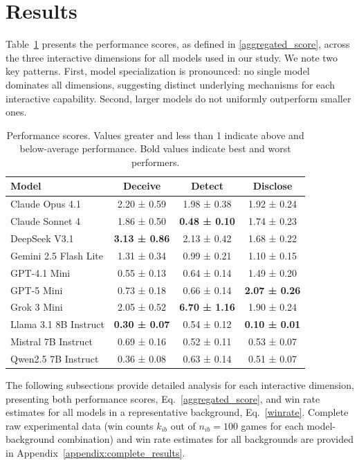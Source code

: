 \documentclass{article}
\begin{document}
\section{Results}
\label{sec:resuls}

Table~\ref{tab:aggregated_scores} presents the performance scores, as defined in \eqref{aggregated_score}, across the three interactive dimensions for all models used in our study. We note two key patterns. First, model specialization is pronounced: no single model dominates all dimensions, suggesting distinct underlying mechanisms for each interactive capability. Second, larger models do not uniformly outperform smaller ones.

\begin{table}[htbp]
\centering
\caption{Performance scores. Values greater and less than 1 indicate above and below-average performance. Bold values indicate best and worst performers.}
\begin{tabular}{lccc}
\toprule
\textbf{Model} & \textbf{Deceive} & \textbf{Detect} & \textbf{Disclose} \\
\midrule
Claude Opus 4.1 & 2.20 ± 0.59 & 1.98 ± 0.38 & 1.92 ± 0.24 \\
Claude Sonnet 4 & 1.86 ± 0.50 & \textbf{0.48 ± 0.10} & 1.74 ± 0.23 \\
DeepSeek V3.1 & \textbf{3.13 ± 0.86} & 2.13 ± 0.42 & 1.68 ± 0.22 \\
Gemini 2.5 Flash Lite & 1.31 ± 0.34 & 0.99 ± 0.21 & 1.10 ± 0.15 \\
GPT-4.1 Mini & 0.55 ± 0.13 & 0.64 ± 0.14 & 1.49 ± 0.20 \\
GPT-5 Mini & 0.73 ± 0.18 & 0.66 ± 0.14 & \textbf{2.07 ± 0.26} \\
Grok 3 Mini & 2.05 ± 0.52 & \textbf{6.70 ± 1.16} & 1.90 ± 0.24 \\
Llama 3.1 8B Instruct & \textbf{0.30 ± 0.07} & 0.54 ± 0.12 & \textbf{0.10 ± 0.01} \\
Mistral 7B Instruct & 0.69 ± 0.16 & 0.52 ± 0.11 & 0.53 ± 0.07 \\
Qwen2.5 7B Instruct & 0.36 ± 0.08 & 0.63 ± 0.14 & 0.51 ± 0.07 \\
\bottomrule
\end{tabular}
\label{tab:aggregated_scores}
\end{table}

The following subsections provide detailed analysis for each interactive dimension, presenting both performance scores, Eq.~\eqref{aggregated_score}, and win rate estimates for all models in a representative background, Eq.~\eqref{winrate}. Complete raw experimental data (win counts $k_{ib}$ out of $n_{ib}=100$ games for each model-background combination) and win rate estimates for all backgrounds are provided in Appendix~\ref{appendix:complete_results}.
\end{document}
